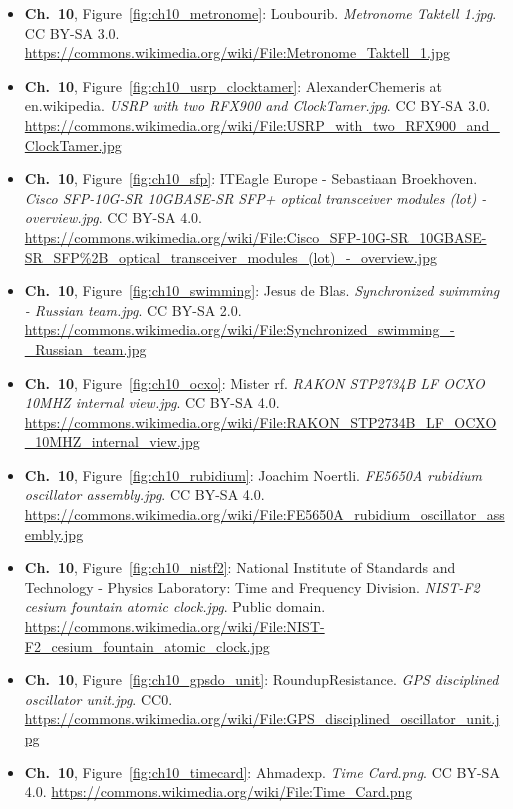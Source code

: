 \begin{small}
\begin{itemize}[leftmargin=0pt,itemsep=2pt,label={}]
\item \textbf{Ch.~10}, Figure~\ref{fig:ch10_metronome}: Loubourib. \emph{Metronome Taktell 1.\allowbreak{}jpg}. CC BY-SA 3.0. \url{https://commons.wikimedia.org/wiki/File:Metronome_Taktell_1.jpg}
\item \textbf{Ch.~10}, Figure~\ref{fig:ch10_usrp_clocktamer}: AlexanderChemeris at en.wikipedia. \emph{USRP with two RFX900 and ClockTamer.\allowbreak{}jpg}. CC BY-SA 3.0. \url{https://commons.wikimedia.org/wiki/File:USRP_with_two_RFX900_and_ClockTamer.jpg}
\item \textbf{Ch.~10}, Figure~\ref{fig:ch10_sfp}: ITEagle Europe - Sebastiaan Broekhoven. \emph{Cisco SFP-\allowbreak{}10G-\allowbreak{}SR 10GBASE-\allowbreak{}SR SFP+ optical transceiver modules (lot) -\allowbreak{} overview.\allowbreak{}jpg}. CC BY-SA 4.0. \url{https://commons.wikimedia.org/wiki/File:Cisco_SFP-10G-SR_10GBASE-SR_SFP%2B_optical_transceiver_modules_(lot)_-_overview.jpg}
\item \textbf{Ch.~10}, Figure~\ref{fig:ch10_swimming}: Jesus de Blas. \emph{Synchronized swimming -\allowbreak{} Russian team.\allowbreak{}jpg}. CC BY-SA 2.0. \url{https://commons.wikimedia.org/wiki/File:Synchronized_swimming_-_Russian_team.jpg}
\item \textbf{Ch.~10}, Figure~\ref{fig:ch10_ocxo}: Mister rf. \emph{RAKON STP2734B LF OCXO 10MHZ internal view.\allowbreak{}jpg}. CC BY-SA 4.0. \url{https://commons.wikimedia.org/wiki/File:RAKON_STP2734B_LF_OCXO_10MHZ_internal_view.jpg}
\item \textbf{Ch.~10}, Figure~\ref{fig:ch10_rubidium}: Joachim Noertli. \emph{FE5650A rubidium oscillator assembly.\allowbreak{}jpg}. CC BY-SA 4.0. \url{https://commons.wikimedia.org/wiki/File:FE5650A_rubidium_oscillator_assembly.jpg}
\item \textbf{Ch.~10}, Figure~\ref{fig:ch10_nistf2}: National Institute of Standards and Technology - Physics Laboratory: Time and Frequency Division. \emph{NIST-\allowbreak{}F2 cesium fountain atomic clock.\allowbreak{}jpg}. Public domain. \url{https://commons.wikimedia.org/wiki/File:NIST-F2_cesium_fountain_atomic_clock.jpg}
\item \textbf{Ch.~10}, Figure~\ref{fig:ch10_gpsdo_unit}: RoundupResistance. \emph{GPS disciplined oscillator unit.\allowbreak{}jpg}. CC0. \url{https://commons.wikimedia.org/wiki/File:GPS_disciplined_oscillator_unit.jpg}
\item \textbf{Ch.~10}, Figure~\ref{fig:ch10_timecard}: Ahmadexp. \emph{Time Card.\allowbreak{}png}. CC BY-SA 4.0. \url{https://commons.wikimedia.org/wiki/File:Time_Card.png}

\end{itemize}
\end{small}
